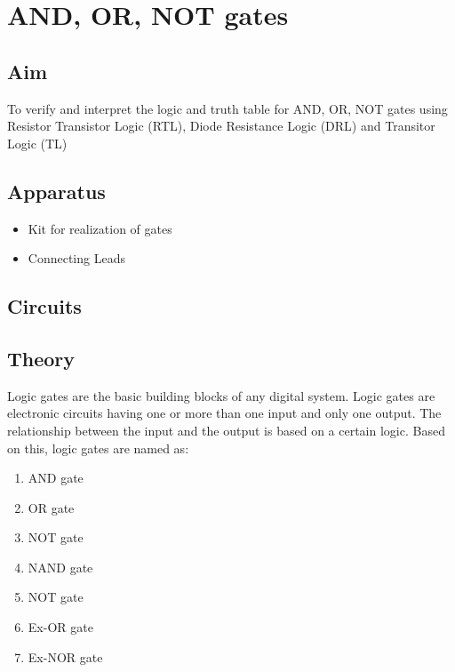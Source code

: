 \chapter{AND, OR, NOT gates}

\section{Aim}
	To verify and interpret the logic and truth table for AND, OR, NOT gates using Resistor Transistor Logic (RTL), Diode Resistance Logic (DRL) and Transitor Logic (TL) 

\section{Apparatus}
	\begin{itemize}
		\tightlist
		\item Kit for realization of gates
		\item Connecting Leads
	\end{itemize}

\section{Circuits}
	

\section{Theory}
	Logic gates are the basic building blocks of any digital system. Logic gates are electronic circuits having one or more than one input and only one output. The relationship between the input and the output is based on a certain logic. Based on this, logic gates are named as:
	\begin{enumerate}
		\tightlist
		\item AND gate
		\item OR gate
		\item NOT gate
		\item NAND gate
		\item NOT gate
		\item Ex-OR gate
		\item Ex-NOR gate
	\end{enumerate}
	

